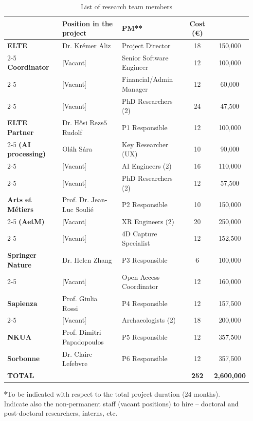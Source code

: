 \begin{table}[H]
\centering
\small
\renewcommand{\arraystretch}{1.3}
\caption{List of research team members}
\begin{tabularx}{\textwidth}{|l|X|l|c|c|}
\hline
\rowcolor{gray!15} \multicolumn{2}{|l|}{\textbf{List of research team members}} & \textbf{Position in the project} & \textbf{PM**} & \textbf{Cost (€)} \\ \hline
\textbf{ELTE} & Dr. Krémer Aliz & Project Director & 18 & 150,000 \\ \cline{2-5}
\textbf{Coordinator} & [Vacant] & Senior Software Engineer & 12 & 100,000 \\ \cline{2-5}
& [Vacant] & Financial/Admin Manager & 12 & 60,000 \\ \cline{2-5}
& [Vacant] & PhD Researchers (2) & 24 & 47,500 \\ \hline
\textbf{ELTE Partner} & Dr. Hősi Rezső Rudolf & P1 Responsible & 12 & 100,000 \\ \cline{2-5}
\textbf{(AI processing)} & Oláh Sára & Key Researcher (UX) & 10 & 90,000 \\ \cline{2-5}
& [Vacant] & AI Engineers (2) & 16 & 110,000 \\ \cline{2-5}
& [Vacant] & PhD Researchers (2) & 12 & 57,500 \\ \hline
\textbf{Arts et Métiers} & Prof. Dr. Jean-Luc Soulié & P2 Responsible & 10 & 150,000 \\ \cline{2-5}
\textbf{(AetM)} & [Vacant] & XR Engineers (2) & 20 & 250,000 \\ \cline{2-5}
& [Vacant] & 4D Capture Specialist & 12 & 152,500 \\ \hline
\textbf{Springer Nature} & Dr. Helen Zhang & P3 Responsible & 6 & 100,000 \\ \cline{2-5}
& [Vacant] & Open Access Coordinator & 12 & 160,000 \\ \hline
\textbf{Sapienza} & Prof. Giulia Rossi & P4 Responsible & 12 & 157,500 \\ \cline{2-5}
& [Vacant] & Archaeologists (2) & 18 & 200,000 \\ \hline
\textbf{NKUA} & Prof. Dimitri Papadopoulos & P5 Responsible & 12 & 357,500 \\ \hline
\textbf{Sorbonne} & Dr. Claire Lefebvre & P6 Responsible & 12 & 357,500 \\ \hline
\textbf{TOTAL} & & & \textbf{252} & \textbf{2,600,000} \\ \hline
\end{tabularx}
\begin{flushleft}
\scriptsize
*To be indicated with respect to the total project duration (24 months). \\
Indicate also the non-permanent staff (vacant positions) to hire – doctoral and post-doctoral researchers, interns, etc.
\end{flushleft}
\end{table}